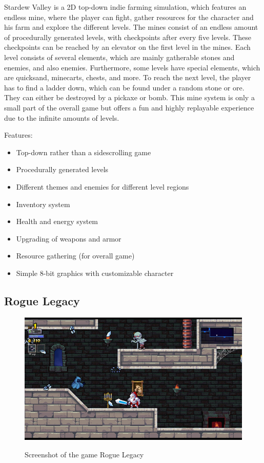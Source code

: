\documentclass[12p]{article}
\begin{document}
Stardew Valley is a 2D top-down indie farming simulation, which features an endless mine, where the player can fight, gather resources for the character and his farm and explore the different levels. The mines consist of an endless amount of procedurally generated levels, with checkpoints after every five levels. These checkpoints can be reached by an elevator on the first level in the mines. Each level consists of several elements, which are mainly gatherable stones and enemies, and also enemies. Furthermore, some levels have special elements, which are quicksand, minecarts, chests, and more. To reach the next level, the player has to find a ladder down, which can be found under a random stone or ore. They can either be destroyed by a pickaxe or bomb. This mine system is only a small part of the overall game but offers a fun and highly replayable experience due to the infinite amounts of levels.

Features:

\begin{itemize}
    \item Top-down rather than a sidescrolling game
    \item Procedurally generated levels
    \item Different themes and enemies for different level regions
    \item Inventory system
    \item Health and energy system
    \item Upgrading of weapons and armor
    \item Resource gathering (for overall game)
    \item Simple 8-bit graphics with customizable character
\end{itemize}


\subsection{Rogue Legacy}

\begin{figure}[ht]
    \center
    \includegraphics[width=1\textwidth]{StateOfTheArtScreenshots/rogue_legacy}
    \label{StateOfTheArt_Screenshots_RogueLegacy}
    \caption{Screenshot of the game Rogue Legacy \cite{RogueLegacyScreenshot}}
\end{figure}
\end{document}
